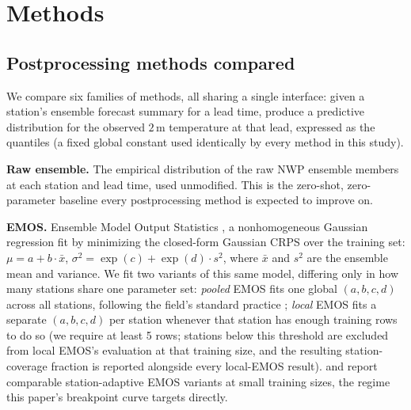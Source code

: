 \section{Methods}
\label{sec:methods}

\subsection{Postprocessing methods compared}
\label{sec:methods-list}

We compare six families of methods, all sharing a single interface: given a
station's ensemble forecast summary for a lead time, produce a predictive
distribution for the observed \(2\,\mathrm{m}\) temperature at that lead,
expressed as the \NQuantileLevels{} quantiles \QuantileLevelsList{} (a fixed
global constant used identically by every method in this study).

\textbf{Raw ensemble.} The empirical distribution of the raw NWP ensemble
members at each station and lead time, used unmodified. This is the
zero-shot, zero-parameter baseline every postprocessing method is expected to
improve on.

\textbf{EMOS.} Ensemble Model Output Statistics \citep{gneiting_2005_emos}, a
nonhomogeneous Gaussian regression fit by minimizing the closed-form Gaussian
CRPS \citep{gneiting_2007_proper_scoring} over the training set:
\(\mu = a + b \cdot \bar{x}\), \(\sigma^2 = \exp(c) + \exp(d) \cdot s^2\),
where \(\bar{x}\) and \(s^2\) are the ensemble mean and variance. We fit two
variants of this same model, differing only in how many stations share one
parameter set: \emph{pooled} EMOS fits one global \((a,b,c,d)\) across all
\NStations{} stations, following the field's standard practice
\citep{gneiting_2005_emos,raftery_2005_bma}; \emph{local} EMOS fits a
separate \((a,b,c,d)\) per station whenever that station has enough training
rows to do so (we require at least 5 rows; stations below this threshold are
excluded from local EMOS's evaluation at that training size, and the
resulting station-coverage fraction is reported alongside every local-EMOS
result). \citet{baran_2016_combining} and \citet{gebetsberger_2018_estimation}
report comparable station-adaptive EMOS variants at small training sizes,
the regime this paper's breakpoint curve targets directly.

